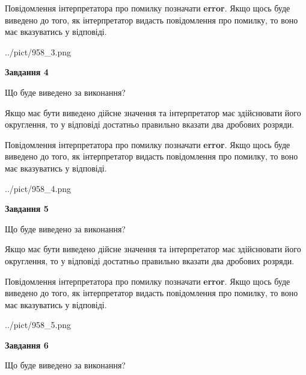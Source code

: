\documentclass[12pt, ukrainian]{article}
\begin{document}
{\begin {Large}
Повідомлення інтерпретатора про помилку позначати \textbf{error}.
Якщо щось буде виведено до того, як інтерпретатор видасть повідомлення про помилку, 
то воно має вказуватись у відповіді. \par

\begin{center}
	{../pict/958_3.png}
\end{center}
\newpage

{\begin {center}\textbf{Завдання 4}\end {center}}\par
Що буде виведено за виконання? \par

Якщо має бути виведено дійсне значення та інтерпретатор має здійснювати його округлення, 
то у відповіді достатньо правильно вказати два дробових розряди.

Повідомлення інтерпретатора про помилку позначати \textbf{error}.
Якщо щось буде виведено до того, як інтерпретатор видасть повідомлення про помилку, 
то воно має вказуватись у відповіді. \par

\begin{center}
	{../pict/958_4.png}
\end{center}
\newpage

{\begin {center}\textbf{Завдання 5}\end {center}}\par
Що буде виведено за виконання? \par

Якщо має бути виведено дійсне значення та інтерпретатор має здійснювати його округлення, 
то у відповіді достатньо правильно вказати два дробових розряди.

Повідомлення інтерпретатора про помилку позначати \textbf{error}.
Якщо щось буде виведено до того, як інтерпретатор видасть повідомлення про помилку, 
то воно має вказуватись у відповіді. \par

\begin{center}
	{../pict/958_5.png}
\end{center}
\newpage

{\begin {center}\textbf{Завдання 6}\end {center}}\par
Що буде виведено за виконання? \par


\end{Large}}
\end{document}
